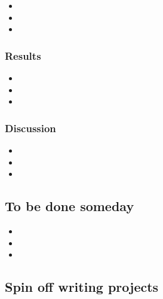 \documentclass[10pt,letterpaper]{article}
\newcommand{\bi}{\begin{itemize}}
\newcommand{\ei}{\end{itemize}}
\begin{document}
\begin{description}
\bi
    \item  
    \item  
    \item  
\ei

\subsubsection{Results}
\label{ssubsec:new-ideas:Results}

\bi
    \item  
    \item  
    \item  
\ei

\subsubsection{Discussion}
\label{ssubsec:new-ideas:Discussion}

\bi
    \item  
    \item  
    \item  
\ei

\subsection{To be done someday}
\label{subsec:someday}



\bi
    \item  
    \item  
    \item  
\ei

\subsection{Spin off writing projects}
\label{subsec:spinoffs}


\begin{description}
    \item [ ]
    \item [ ]
    \item [ ]
    \item [ ]
\end{description}




\end{description}
\end{document}
